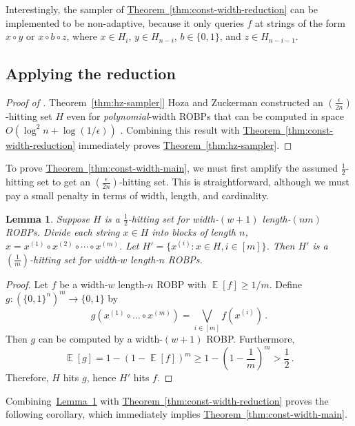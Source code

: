 \documentclass[11pt]{article}
\numberwithin{equation}{section}
\newtheorem{lemma}[theorem]{Lemma}
\theoremstyle{definition}
\theoremstyle{plain}
\newcommand{\expref}[2]{\hyperref[#2]{#1~\ref{#2}}}
\DeclareMathOperator*{\ExpVal}{\mathbb{E}}
\begin{document}
Interestingly, the sampler of \expref{Theorem}{thm:const-width-reduction} can be implemented to be non-adaptive, because it only queries $f$ at strings of the form $x \circ y$ or $x \circ b \circ z$, where $x \in H_i$, $y \in H_{n - i}$, $b \in \{0, 1\}$, and $z \in H_{n - i - 1}$.

\subsection{Applying the reduction}

\begin{proof}[Proof of \expref{Theorem}{thm:hz-sampler}]
Hoza and Zuckerman constructed an $\left(\frac{\epsilon}{2n}\right)$-hitting set $H$ even for \emph{polynomial}-width ROBPs that can be computed in space $O(\log^2 n + \log(1/\epsilon))$ \cite{HZ20}. Combining this result with \expref{Theorem}{thm:const-width-reduction} immediately proves \expref{Theorem}{thm:hz-sampler}.
\end{proof}

To prove \expref{Theorem}{thm:const-width-main}, we must first amplify the assumed $\frac{1}{2}$-hitting set to get an $\left(\frac{\epsilon}{2n}\right)$-hitting set. This is straightforward, although we must pay a small penalty in terms of width, length, and cardinality.
\begin{lemma} \label{lem:hitting-set-amplification}
Suppose $H$ is a $\frac{1}{2}$-hitting set for width-$(w + 1)$ length-$(nm)$ ROBPs. Divide each string $x \in H$ into blocks of length $n$, $x = x^{(1)} \circ x^{(2)} \circ \cdots \circ x^{(m)}$. Let $H' = \{x^{(i)} : x \in H, i \in [m]\}$. Then $H'$ is a $(\frac{1}{m})$-hitting set for width-$w$ length-$n$ ROBPs.
\end{lemma}

\begin{proof}
Let $f$ be a width-$w$ length-$n$ ROBP with $\ExpVal[f] \geq 1/m$. Define $g \colon (\{0, 1\}^n)^m \to \{0, 1\}$ by
$$
g(x^{(1)} \circ \dots \circ x^{(m)}) = \bigvee_{i \in [m]} f(x^{(i)})\,.
$$
Then $g$ can be computed by a width-$(w + 1)$ ROBP. Furthermore,
$$
\ExpVal[g] = 1 - (1 - \ExpVal[f])^m \geq 1 - \left(1 - \frac{1}{m}\right)^m > \frac{1}{2}\,.
$$
Therefore, $H$ hits $g$, hence $H'$ hits $f$.
\end{proof}

Combining~\expref{Lemma}{lem:hitting-set-amplification} with \expref{Theorem}{thm:const-width-reduction} proves the following corollary, which immediately implies \expref{Theorem}{thm:const-width-main}.
\end{document}
